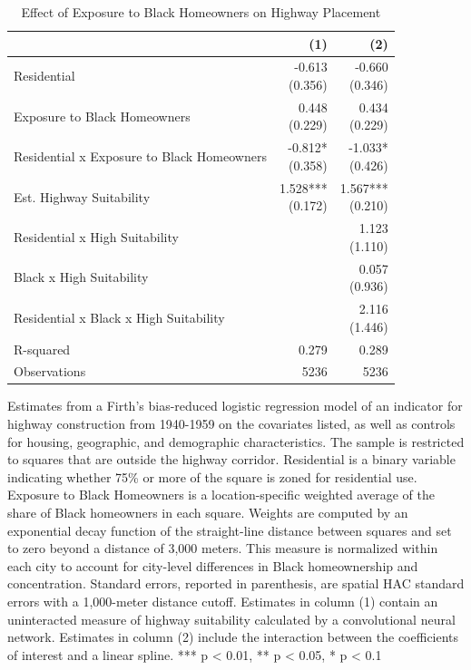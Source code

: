 \begin{table}[h]
\centering
\caption{Effect of Exposure to Black Homeowners on Highway Placement}
\label{tab:outside_corridor_black_homeowners}
\begin{threeparttable}
\begin{tabular*}{0.8\textwidth}{@{\extracolsep{\fill}}l*{2}{r}}
\toprule
 & (1) & (2) \\
\midrule
Residential & \makecell[tr]{-0.613 \\ (0.356)} & \makecell[tr]{-0.660 \\ (0.346)} \\
Exposure to Black Homeowners & \makecell[tr]{0.448 \\ (0.229)} & \makecell[tr]{0.434 \\ (0.229)} \\
Residential x Exposure to Black Homeowners & \makecell[tr]{-0.812{*} \\ (0.358)} & \makecell[tr]{-1.033{*} \\ (0.426)} \\
Est. Highway Suitability & \makecell[tr]{1.528{***} \\ (0.172)} & \makecell[tr]{1.567{***} \\ (0.210)} \\
Residential x High Suitability &  & \makecell[tr]{1.123 \\ (1.110)} \\
Black x High Suitability &  & \makecell[tr]{0.057 \\ (0.936)} \\
Residential x Black x High Suitability &  & \makecell[tr]{2.116 \\ (1.446)} \\
R-squared & 0.279 & 0.289 \\
Observations & 5236 & 5236 \\
\bottomrule
\end{tabular*}
\begin{tablenotes}[flushleft]
\footnotesize
\item Estimates from a Firth's bias-reduced logistic regression model of an indicator for highway construction from 1940-1959 on the covariates listed, as well as controls for housing, geographic, and demographic characteristics. The sample is restricted to squares that are outside the highway corridor. Residential is a binary variable indicating whether 75\% or more of the square is zoned for residential use. Exposure to Black Homeowners is a location-specific weighted average of the share of Black homeowners in each square. Weights are computed by an exponential decay function of the straight-line distance between squares and set to zero beyond a distance of 3,000 meters. This measure is normalized within each city to account for city-level differences in Black homeownership and concentration. Standard errors, reported in parenthesis, are \textcite{conley_gmm_1999} spatial HAC standard errors with a 1,000-meter distance cutoff. Estimates in column (1) contain an uninteracted measure of highway suitability calculated by a convolutional neural network. Estimates in column (2) include the interaction between the coefficients of interest and a linear spline. *** p < 0.01, ** p < 0.05, * p < 0.1

\end{tablenotes}
\end{threeparttable}
\end{table}
